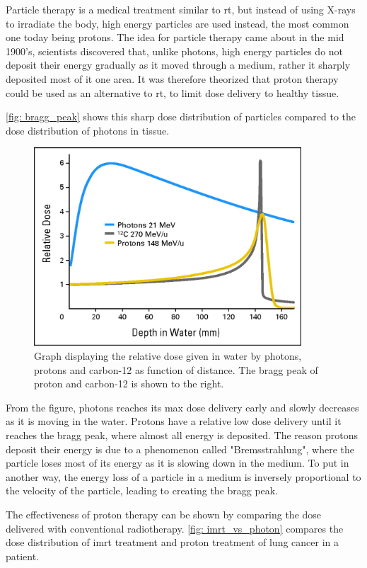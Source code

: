 \documentclass[main.tex]{subfiles}
\begin{document}
Particle therapy is a medical treatment similar to \gls{rt}, but instead of using X-rays to irradiate the body, high energy particles are used instead, the most common one today being protons. The idea for particle therapy came about in the mid 1900's, scientists discovered that, unlike photons, high energy particles do not deposit their energy gradually as it moved through a medium, rather it sharply deposited most of it one area. It was therefore theorized that proton therapy could be used as an alternative to \gls{rt}, to limit dose delivery to healthy tissue. 

\autoref{fig: bragg_peak} shows this sharp dose distribution of particles compared to the dose distribution of photons in tissue.

 \begin{figure}[!htpb]
    \centering
    \includegraphics[width=10cm ]{images/bragg_peak.jpeg}
    \caption{Graph displaying the relative dose given in water by photons, protons and carbon-12 as function of distance. The bragg peak of proton and carbon-12 is shown to the right.\cite{bragg_peak_image}}
    \label{fig: bragg_peak}
\end{figure}
\FloatBarrier 

From the figure, photons reaches its max dose delivery early and slowly decreases as it is moving in the water. Protons have a relative low dose delivery until it reaches the bragg peak, where almost all energy is deposited. The reason protons deposit their energy is due to a phenomenon called "Bremsstrahlung", where the particle loses most of its energy as it is slowing down in the medium. To put in another way, the energy loss of a particle in a medium is inversely proportional to the velocity of the particle, leading to creating the bragg peak.

The effectiveness of proton therapy can be shown by comparing the dose delivered with conventional radiotherapy. \autoref{fig: imrt_vs_photon} compares the dose distribution of \gls{imrt} treatment and proton treatment of lung cancer in a patient.
\end{document}
